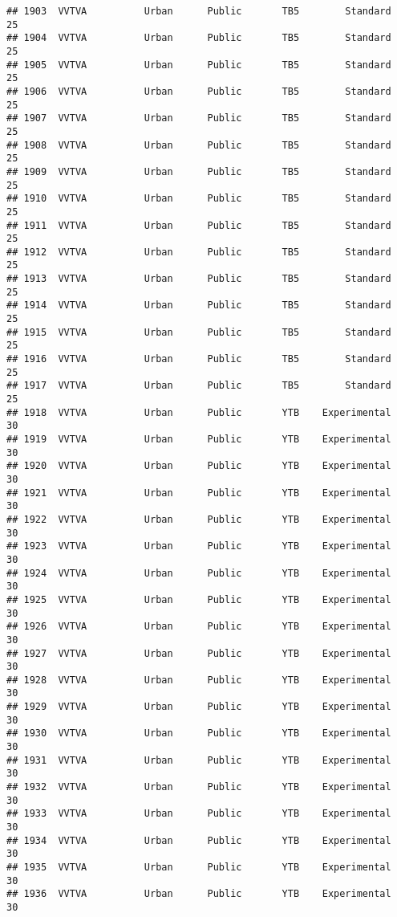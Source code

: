 \documentclass[
]{article}
\begin{document}
\begin{verbatim}
## 1903  VVTVA          Urban      Public       TB5        Standard        25
## 1904  VVTVA          Urban      Public       TB5        Standard        25
## 1905  VVTVA          Urban      Public       TB5        Standard        25
## 1906  VVTVA          Urban      Public       TB5        Standard        25
## 1907  VVTVA          Urban      Public       TB5        Standard        25
## 1908  VVTVA          Urban      Public       TB5        Standard        25
## 1909  VVTVA          Urban      Public       TB5        Standard        25
## 1910  VVTVA          Urban      Public       TB5        Standard        25
## 1911  VVTVA          Urban      Public       TB5        Standard        25
## 1912  VVTVA          Urban      Public       TB5        Standard        25
## 1913  VVTVA          Urban      Public       TB5        Standard        25
## 1914  VVTVA          Urban      Public       TB5        Standard        25
## 1915  VVTVA          Urban      Public       TB5        Standard        25
## 1916  VVTVA          Urban      Public       TB5        Standard        25
## 1917  VVTVA          Urban      Public       TB5        Standard        25
## 1918  VVTVA          Urban      Public       YTB    Experimental        30
## 1919  VVTVA          Urban      Public       YTB    Experimental        30
## 1920  VVTVA          Urban      Public       YTB    Experimental        30
## 1921  VVTVA          Urban      Public       YTB    Experimental        30
## 1922  VVTVA          Urban      Public       YTB    Experimental        30
## 1923  VVTVA          Urban      Public       YTB    Experimental        30
## 1924  VVTVA          Urban      Public       YTB    Experimental        30
## 1925  VVTVA          Urban      Public       YTB    Experimental        30
## 1926  VVTVA          Urban      Public       YTB    Experimental        30
## 1927  VVTVA          Urban      Public       YTB    Experimental        30
## 1928  VVTVA          Urban      Public       YTB    Experimental        30
## 1929  VVTVA          Urban      Public       YTB    Experimental        30
## 1930  VVTVA          Urban      Public       YTB    Experimental        30
## 1931  VVTVA          Urban      Public       YTB    Experimental        30
## 1932  VVTVA          Urban      Public       YTB    Experimental        30
## 1933  VVTVA          Urban      Public       YTB    Experimental        30
## 1934  VVTVA          Urban      Public       YTB    Experimental        30
## 1935  VVTVA          Urban      Public       YTB    Experimental        30
## 1936  VVTVA          Urban      Public       YTB    Experimental        30

\end{verbatim}
\end{document}
